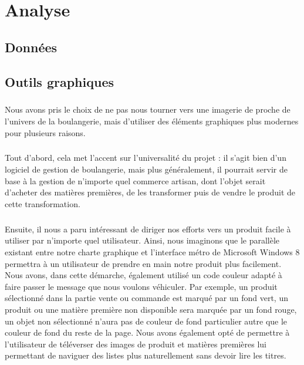 \chapter{Analyse}

\section{Données}

\section{Outils graphiques}
    \paragraph{}
        Nous avons pris le choix de ne pas nous tourner vers une imagerie de
        proche de l'univers de la boulangerie, mais d'utiliser des éléments
        graphiques plus modernes pour plusieurs raisons.
    \paragraph{}
        Tout d'abord, cela met l'accent sur l'universalité du projet :
        il s'agit bien d'un logiciel de gestion de boulangerie, mais plus
        généralement, il pourrait servir de base à la gestion de n'importe
        quel commerce artisan, dont l'objet serait d'acheter des matières
        premières, de les transformer puis de vendre le produit de cette
        transformation.
    \paragraph{}
        Ensuite, il nous a paru intéressant de diriger nos efforts vers un
        produit facile à utiliser par n'importe quel utilisateur.
        Ainsi, nous imaginons que le parallèle existant entre notre charte
        graphique et l'interface métro de Microsoft Windows 8 permettra à un
        utilisateur de prendre en main notre produit plus facilement.
        Nous avons, dans cette démarche, également utilisé un code couleur
        adapté à faire passer le message que nous voulons véhiculer.
        Par exemple, un produit sélectionné dans la partie vente ou commande
        est marqué par un fond vert, un produit ou une matière première non
        disponible sera marquée par un fond rouge, un objet non sélectionné
        n'aura pas de couleur de fond particulier autre que le couleur de fond
        du reste de la page.
        Nous avons également opté de permettre à l'utilisateur de téléverser
        des images de produit et matières premières lui permettant de naviguer
        des listes plus naturellement sans devoir lire les titres.
